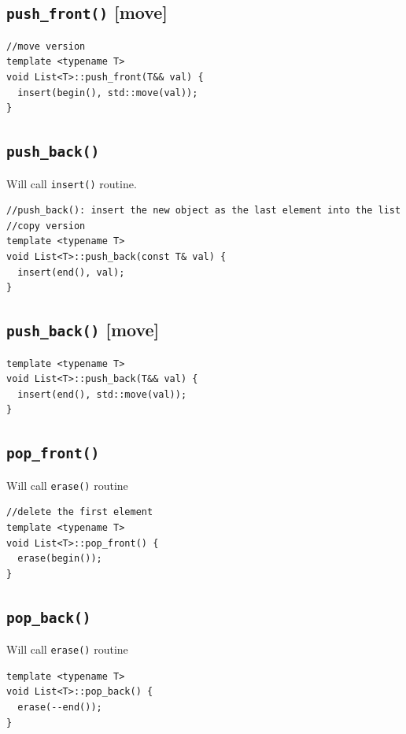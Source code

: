 \documentclass[12pt]{book}
\begin{document}
\subsection{\texttt{push\_front()} [move]}
\label{sec:orgbe4cfe1}
\begin{verbatim}
//move version 
template <typename T>
void List<T>::push_front(T&& val) {
  insert(begin(), std::move(val));
}
\end{verbatim}
\subsection{\texttt{push\_back()}}
\label{sec:org48c9d61}
Will call \texttt{insert()} routine.
\begin{verbatim}
//push_back(): insert the new object as the last element into the list
//copy version 
template <typename T>
void List<T>::push_back(const T& val) {
  insert(end(), val);
}
\end{verbatim}
\subsection{\texttt{push\_back()} [move]}
\label{sec:org26331fd}
\begin{verbatim}
template <typename T>
void List<T>::push_back(T&& val) {
  insert(end(), std::move(val));
}
\end{verbatim}
\subsection{\texttt{pop\_front()}}
\label{sec:org7ca942f}
Will call \texttt{erase()} routine
\begin{verbatim}
//delete the first element 
template <typename T>
void List<T>::pop_front() {
  erase(begin());
}
\end{verbatim}
\subsection{\texttt{pop\_back()}}
\label{sec:orgeb2e2cd}
Will call \texttt{erase()} routine
\begin{verbatim}
template <typename T>
void List<T>::pop_back() {
  erase(--end());
}
\end{verbatim}
\end{document}
